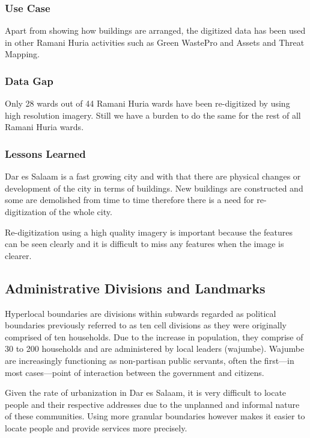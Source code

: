 \documentclass[a4paper,12pt,twoside]{article}
\begin{document}
\subsubsection{Use Case}
Apart from showing how buildings are arranged, the digitized data has been used in other Ramani Huria activities such as Green WastePro and Assets and Threat Mapping.

\subsubsection{Data Gap}

Only 28 wards out of 44 Ramani Huria wards have been re-digitized by using high resolution imagery. Still we have a burden to do the same for the rest of all Ramani Huria wards. 
\subsubsection{Lessons Learned}
Dar es Salaam is a fast growing city and with that there are physical changes or development of the city in terms of buildings. New buildings are constructed and some are demolished from time to time therefore there is a need for re-digitization of the whole city.
\medskip

Re-digitization using a high quality imagery is important because the features can be seen clearly and it is difficult to miss any features when the image is clearer.

\newpage
\subsection{Administrative Divisions and Landmarks}
Hyperlocal boundaries are divisions within subwards regarded as political boundaries previously referred to as ten cell divisions as they were originally comprised of ten households.
Due to the increase in population, they comprise of 30 to 200 households and are administered by local leaders (wajumbe). Wajumbe are increasingly functioning as non-partisan public servants, often the first---in most cases---point of interaction between the government and citizens.

Given the rate of urbanization in Dar es Salaam, it is very difficult to locate people and their respective addresses due to the unplanned and informal nature of these communities. Using more granular boundaries however makes it easier to locate people and provide services more precisely. 
\end{document}
